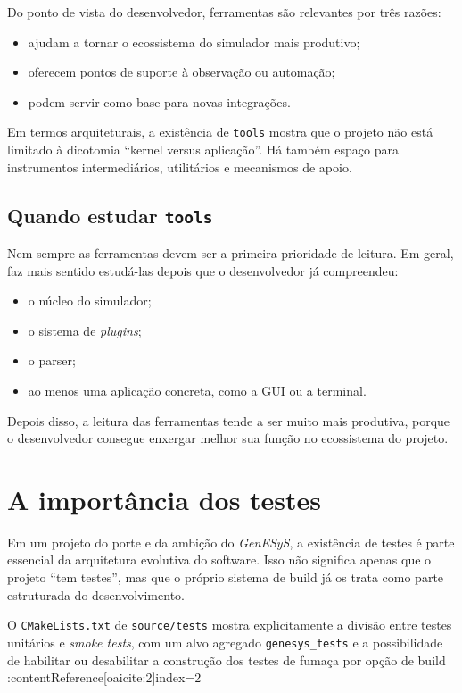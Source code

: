 Do ponto de vista do desenvolvedor, ferramentas são relevantes por três razões:
\begin{itemize}
    \item ajudam a tornar o ecossistema do simulador mais produtivo;
    \item oferecem pontos de suporte à observação ou automação;
    \item podem servir como base para novas integrações.
\end{itemize}

Em termos arquiteturais, a existência de \texttt{tools} mostra que o projeto não está limitado à dicotomia ``kernel versus aplicação''. Há também espaço para instrumentos intermediários, utilitários e mecanismos de apoio.

\subsection{Quando estudar \texttt{tools}}
\label{subsec:cap10_quando_estudar_tools}

Nem sempre as ferramentas devem ser a primeira prioridade de leitura. Em geral, faz mais sentido estudá-las depois que o desenvolvedor já compreendeu:
\begin{itemize}
    \item o núcleo do simulador;
    \item o sistema de \textit{plugins};
    \item o parser;
    \item ao menos uma aplicação concreta, como a GUI ou a terminal.
\end{itemize}

Depois disso, a leitura das ferramentas tende a ser muito mais produtiva, porque o desenvolvedor consegue enxergar melhor sua função no ecossistema do projeto.

\section{A importância dos testes}
\label{sec:cap10_importancia_dos_testes}

Em um projeto do porte e da ambição do \textit{GenESyS}, a existência de testes é parte essencial da arquitetura evolutiva do software. Isso não significa apenas que o projeto ``tem testes'', mas que o próprio sistema de build já os trata como parte estruturada do desenvolvimento.

O \texttt{CMakeLists.txt} de \texttt{source/tests} mostra explicitamente a divisão entre testes unitários e \textit{smoke tests}, com um alvo agregado \texttt{genesys\_tests} e a possibilidade de habilitar ou desabilitar a construção dos testes de fumaça por opção de build :contentReference[oaicite:2]{index=2}

